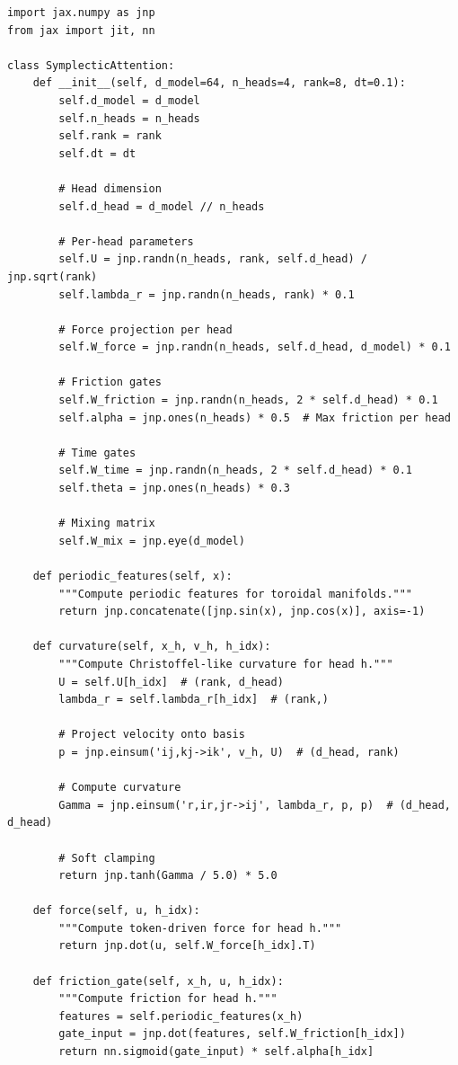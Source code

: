 \documentclass[12pt,letterpaper,twoside]{article}
\begin{document}
\begin{verbatim}
import jax.numpy as jnp
from jax import jit, nn

class SymplecticAttention:
    def __init__(self, d_model=64, n_heads=4, rank=8, dt=0.1):
        self.d_model = d_model
        self.n_heads = n_heads
        self.rank = rank
        self.dt = dt
        
        # Head dimension
        self.d_head = d_model // n_heads
        
        # Per-head parameters
        self.U = jnp.randn(n_heads, rank, self.d_head) / jnp.sqrt(rank)
        self.lambda_r = jnp.randn(n_heads, rank) * 0.1
        
        # Force projection per head
        self.W_force = jnp.randn(n_heads, self.d_head, d_model) * 0.1
        
        # Friction gates
        self.W_friction = jnp.randn(n_heads, 2 * self.d_head) * 0.1
        self.alpha = jnp.ones(n_heads) * 0.5  # Max friction per head
        
        # Time gates
        self.W_time = jnp.randn(n_heads, 2 * self.d_head) * 0.1
        self.theta = jnp.ones(n_heads) * 0.3
        
        # Mixing matrix
        self.W_mix = jnp.eye(d_model)
        
    def periodic_features(self, x):
        """Compute periodic features for toroidal manifolds."""
        return jnp.concatenate([jnp.sin(x), jnp.cos(x)], axis=-1)
    
    def curvature(self, x_h, v_h, h_idx):
        """Compute Christoffel-like curvature for head h."""
        U = self.U[h_idx]  # (rank, d_head)
        lambda_r = self.lambda_r[h_idx]  # (rank,)
        
        # Project velocity onto basis
        p = jnp.einsum('ij,kj->ik', v_h, U)  # (d_head, rank)
        
        # Compute curvature
        Gamma = jnp.einsum('r,ir,jr->ij', lambda_r, p, p)  # (d_head, d_head)
        
        # Soft clamping
        return jnp.tanh(Gamma / 5.0) * 5.0
    
    def force(self, u, h_idx):
        """Compute token-driven force for head h."""
        return jnp.dot(u, self.W_force[h_idx].T)
    
    def friction_gate(self, x_h, u, h_idx):
        """Compute friction for head h."""
        features = self.periodic_features(x_h)
        gate_input = jnp.dot(features, self.W_friction[h_idx])
        return nn.sigmoid(gate_input) * self.alpha[h_idx]
    

\end{verbatim}
\end{document}

